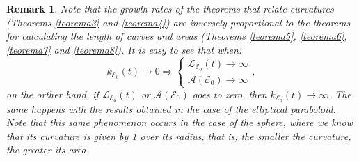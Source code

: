 \documentclass{amsart}
\theoremstyle{plain}
\newtheorem{remark}{Remark}
\numberwithin{equation}{section}
\begin{document}
\begin{remark}
	Note that the growth rates of the theorems that relate curvatures (Theorems \ref{teorema3} and \ref{teorema4}) are inversely proportional to the theorems for calculating the length of curves and areas (Theorems \ref{teorema5}, \ref{teorema6}, \ref{teorema7} and \ref{teorema8}).
	It is easy to see that when:
	$$
	k_{\mathcal{E}_0}(t) \longrightarrow 0 \Longrightarrow
	\begin{cases}
		\mathcal{L}_{\mathcal{E}_0}(t) \longrightarrow \infty \\
		\mathcal{A}(\mathcal{E}_0) \longrightarrow \infty
	\end{cases},
	$$
	on the orther hand, if $\mathcal{L}_{\mathcal{E}_0}(t)$ or $\mathcal{A}(\mathcal{E}_0)$ goes to zero, then $k_{\mathcal{E}_0}(t) \longrightarrow \infty$. The same happens with the results obtained in the case of the elliptical paraboloid. Note that this same phenomenon occurs in the case of the sphere, where we know that its curvature is given by 1 over its radius, that is, the smaller the curvature, the greater its area.
\end{remark}
	
	
\end{document}

